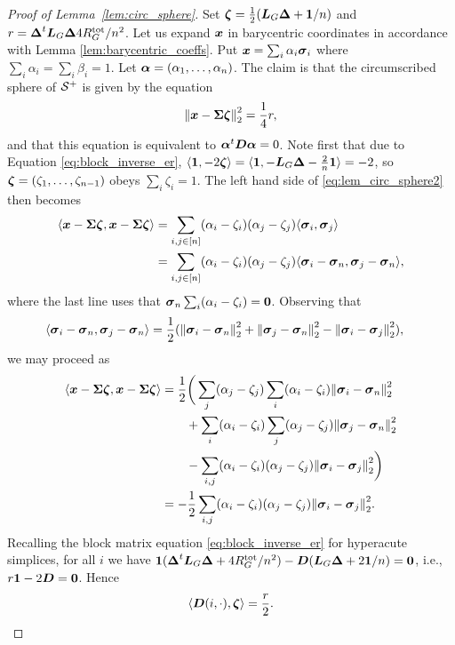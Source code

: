 \begin{proof}[Proof of Lemma~\ref{lem:circ_sphere}]
	Set $\vb*{\zeta} = \frac{1}{2}(\vb*{L}_G\vb*{\Delta}+ \vb{1}/n)$ and $r = \vb*{\Delta}^t \vb*{L}_G\vb*{\Delta} 4R^{\textnormal{tot}}_G/n^2$. 
	Let us expand $\vb*{x}$ in barycentric coordinates in accordance with Lemma \ref{lem:barycentric_coeffs}.  Put $\vb*{x}=\sum_i \alpha_i\vb*{\sigma}_i$ where $\sum_i\alpha_i=\sum_i\beta_i=1$. Let $\vb*{\alpha}=(\alpha_1,\dots,\alpha_n)$. 
	The claim is that the circumscribed sphere of $\mathcal{S}^+$ is given by the equation 
	\begin{equation}
	\label{eq:lem_circ_sphere2}
	\norm{\vb*{x} - \boldsymbol{\Sigma}\vb*{\zeta}}_2^2 = \frac{1}{4}r,
	\end{equation}
	and that this equation is equivalent to $\vb*{\alpha}^t \vb*{D}\vb*{\alpha}=0$. Note first that due to Equation \ref{eq:block_inverse_er}, $\langle \vb{1}, -2\vb*{\zeta}\rangle = \langle \vb{1}, -\vb*{L}_G\vb*{\Delta} - \frac{2}{n}\vb{1}\rangle = -2$, so $\vb*{\zeta}=(\zeta_1,\dots,\zeta_{n-1})$ obeys $\sum_i \zeta_i=1$.  The left hand side of \eqref{eq:lem_circ_sphere2} then becomes 
	\begin{align*}
	\langle \vb*{x}-\boldsymbol{\Sigma}\vb*{\zeta},\vb*{x}-\boldsymbol{\Sigma}\vb*{\zeta}\rangle &= \sum_{i,j\in[n]} (\alpha_i-\zeta_i)(\alpha_j-\zeta_j) \langle \vb*{\sigma}_i,\vb*{\sigma}_j\rangle \\
	&= \sum_{i,j\in[n]} (\alpha_i-\zeta_i)(\alpha_j-\zeta_j) \langle \vb*{\sigma}_i-\vb*{\sigma}_n,\vb*{\sigma}_j-\vb*{\sigma}_n\rangle,
	\end{align*} 
	where the last line uses that $\vb*{\sigma}_n \sum_i(\alpha_i-\zeta_i)=\vb{0}$. 
	Observing that 
	\begin{align*}
	\langle \vb*{\sigma}_i-\vb*{\sigma}_n,\vb*{\sigma}_j-\vb*{\sigma}_n\rangle &= \frac{1}{2}(\norm{\vb*{\sigma}_i-\vb*{\sigma}_n}_2^2 + \norm{\vb*{\sigma}_j-\vb*{\sigma}_n}_2^2 - \norm{\vb*{\sigma}_i-\vb*{\sigma}_j}_2^2),
	\end{align*}
	we may proceed as
	\begin{align}
	\langle\vb*{x}-\boldsymbol{\Sigma}\vb*{\zeta},\vb*{x}-\boldsymbol{\Sigma}\vb*{\zeta}\rangle &= \frac{1}{2}\bigg(\sum_j (\alpha_j-\zeta_j) \sum_i (\alpha_i-\zeta_i)\norm{\vb*{\sigma}_i-\vb*{\sigma}_n}_2^2 \notag \\
	&\qquad + \sum_i (\alpha_i-\zeta_i) \sum_j (\alpha_j-\zeta_j)\norm{\vb*{\sigma}_j-\vb*{\sigma}_n}_2^2  \notag \\
	&\qquad - \sum_{i,j} (\alpha_i-\zeta_i)(\alpha_j-\zeta_j)\norm{\vb*{\sigma}_i-\vb*{\sigma}_j}_2^2 \bigg)\notag \\
	&= -\frac{1}{2}\sum_{i,j} (\alpha_i-\zeta_i)(\alpha_j-\zeta_j)\norm{\vb*{\sigma}_i-\vb*{\sigma}_j}_2^2. \label{eq:lem_circ_sphere}
	\end{align} 
	Recalling the block matrix equation \eqref{eq:block_inverse_er} for hyperacute simplices, for all $i$ we have $\vb{1} (\vb*{\Delta}^t \vb*{L}_G\vb*{\Delta} + 4R^{\textnormal{tot}}_G/n^2) - \vb*{D}(\vb*{L}_G\vb*{\Delta} + 2\vb{1} /n) = \vb{0}$, i.e., $r\vb{1} -2\vb*{D} =\vb{0}$. Hence 
	\[\langle \vb*{D}(i,\cdot),\vb*{\zeta}\rangle = \frac{r}{2}.\]

\end{proof}
